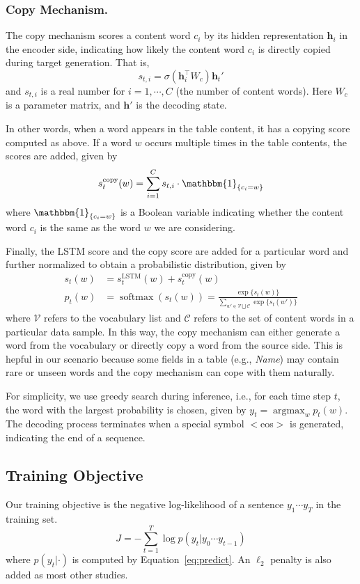 \documentclass[letterpaper]{article} %
\DeclareMathOperator*{\argmax}{argmax}
\begin{document}
\subsubsection{Copy Mechanism.}
The copy mechanism scores a content word $c_i$ by its hidden representation $\bm h_i$ in the encoder side, indicating how likely the content word $c_i$ is directly copied during target generation. That is,
\begin{equation}
s_{t,i}=\sigma(\bm h_i^\top W_c)\bm h_{t}'
\end{equation}
and $s_{t,i}$ is a real number for $i=1,\cdots, C$ (the number of content words). Here $W_c$ is a parameter matrix, and $\bm h'$ is the decoding state.

In other words, when a word appears in the table content, it has a copying score computed as above. If a word $w$ occurs multiple times in the table contents, the scores are added, given by
\begin{equation}
s_t^\text{copy}(w)= \sum_{i=1}^Cs_{t,i} \cdot \mathbbm{1}_{\{c_i=w\}}
\end{equation}
where $\mathbbm{1}_{\{c_i=w\}}$ is a Boolean variable indicating whether the content word $c_i$ is the same as the word $w$ we are considering.

Finally, the LSTM score and the copy score are added for a particular word and
further normalized to obtain a probabilistic distribution, given by
\begin{align}
s_t(w)&=s_t^\text{LSTM}(w) + s_t^\text{copy}(w)\\
p_t(w)&=\operatorname{softmax}\left(s_t(w)\right)=\frac{\exp\{s_t(w)\}}{\sum\limits_{w'\in\mathcal{V}\bigcup\mathcal{C}}\exp\{s_t(w')\}}
\label{eq:predict}
\end{align}
where $\mathcal{V}$ refers to the vocabulary list and $\mathcal{C}$ refers to the set of content words in a particular data sample.
In this way, the copy mechanism can either generate a word from the vocabulary or directly copy a word from the source side. This is hepful in our scenario because some fields in a table (e.g., \textit{Name}) may contain rare or unseen words and the copy mechanism can cope with them naturally.

For simplicity, we use greedy search during inference, i.e., for each time step $t$, the word with the largest probability is chosen, given by
$y_t=\argmax_w{p_t(w)}$. The decoding process terminates when a special symbol $<$eos$>$ is generated, indicating the end of a sequence.

\subsection{Training Objective}
Our training objective is the negative log-likelihood of a sentence $y_1\cdots y_T$ in the training set.
\begin{equation}\label{eq:obj}
J=-\sum_{t=1}^T\log p(y_t|y_0\cdots y_{t-1})
\end{equation}
where $p(y_t|\cdot)$ is computed by Equation~\ref{eq:predict}. An $\ell_2$ penalty is also added as most other studies.
\end{document}
